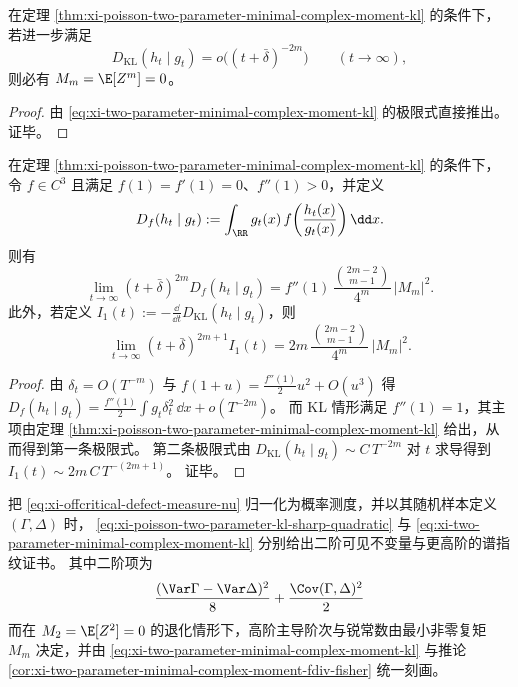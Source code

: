 \begin{corollary}\label{cor:xi-two-parameter-minimal-complex-moment-rigidity}
在定理 \ref{thm:xi-poisson-two-parameter-minimal-complex-moment-kl} 的条件下，若进一步满足
\[
D_{\mathrm{KL}}(h_t\mid g_t)=o\!\bigl((t+\bar\delta)^{-2m}\bigr)\qquad(t\to\infty),
\]
则必有 \(M_m=\E[Z^m]=0\)。
\end{corollary}
\begin{proof}
由 \eqref{eq:xi-two-parameter-minimal-complex-moment-kl} 的极限式直接推出。证毕。
\end{proof}

\begin{corollary}\label{cor:xi-two-parameter-minimal-complex-moment-fdiv-fisher}
在定理 \ref{thm:xi-poisson-two-parameter-minimal-complex-moment-kl} 的条件下，
令 \(f\in C^3\) 且满足 \(f(1)=f'(1)=0\)、\(f''(1)>0\)，并定义
\[
D_f(h_t\mid g_t):=\int_{\RR} g_t(x)\,f\!\left(\frac{h_t(x)}{g_t(x)}\right)\dd x.
\]
则有
\[
\lim_{t\to\infty}(t+\bar\delta)^{2m}D_f(h_t\mid g_t)
=f''(1)\,\frac{\binom{2m-2}{m-1}}{4^{m}}\,|M_m|^2.
\]
此外，若定义
\(
I_1(t):=-\frac{\dd}{\dd t}D_{\mathrm{KL}}(h_t\mid g_t)
\)，则
\[
\lim_{t\to\infty}(t+\bar\delta)^{2m+1}I_1(t)
=2m\,\frac{\binom{2m-2}{m-1}}{4^{m}}\,|M_m|^2.
\]
\end{corollary}
\begin{proof}
由 \(\delta_t=O(T^{-m})\) 与 \(f(1+u)=\frac{f''(1)}{2}u^2+O(u^3)\) 得
\(
D_f(h_t\mid g_t)=\frac{f''(1)}{2}\int g_t\delta_t^2\,\dd x+o(T^{-2m})
\)。
而 KL 情形满足 \(f''(1)=1\)，其主项由定理 \ref{thm:xi-poisson-two-parameter-minimal-complex-moment-kl} 给出，从而得到第一条极限式。
第二条极限式由
\(
D_{\mathrm{KL}}(h_t\mid g_t)\sim C\,T^{-2m}
\)
对 \(t\) 求导得到
\(
I_1(t)\sim 2m\,C\,T^{-(2m+1)}
\)。
证毕。
\end{proof}

\begin{remark}\label{rem:xi-poisson-two-parameter-defect-measure-fusion}
把 \eqref{eq:xi-offcritical-defect-measure-nu} 归一化为概率测度，并以其随机样本定义 \((\Gamma,\Delta)\) 时，
\eqref{eq:xi-poisson-two-parameter-kl-sharp-quadratic}
与 \eqref{eq:xi-two-parameter-minimal-complex-moment-kl}
分别给出二阶可见不变量与更高阶的谱指纹证书。
其中二阶项为
\[
\frac{(\Var\Gamma-\Var\Delta)^2}{8}
+\frac{\Cov(\Gamma,\Delta)^2}{2}
\]
而在 \(M_2=\E[Z^2]=0\) 的退化情形下，高阶主导阶次与锐常数由最小非零复矩 \(M_m\) 决定，并由 \eqref{eq:xi-two-parameter-minimal-complex-moment-kl} 与推论 \ref{cor:xi-two-parameter-minimal-complex-moment-fdiv-fisher} 统一刻画。
\end{remark}

\endinput
